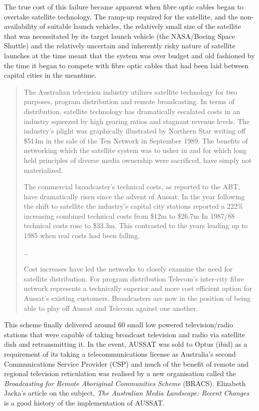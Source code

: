 The true cost of this failure became apparent when fibre optic cables began to overtake satellite technology. The ramp-up required for the satellite, and the non-availability of suitable launch vehicles, the relatively small size of the satellite that was necessitated by its target launch vehicle (the NASA/Boeing Space Shuttle) and the relatively uncertain and inherently risky nature of satellite launches at the time meant that the system was over budget and old fashioned by the time it began to compete with fibre optic cables that had been laid between capital cities in the meantime.
\begin{quotation}
The Australian television industry utilizes satellite technology for two purposes, program distribution and remote broadcasting. In terms of distribution, satellite technology has dramatically escalated costs in an industry squeezed by high gearing ratios and stagnant revenue levels. The industry's plight was graphically illustrated by Northern Star writing off \$514m in the sale of the Ten Network in September 1989. The benefits of networking which the satellite system was to usher in and for which long held principles of diverse media ownership were sacrificed, have simply not materialized.

The commercial broadcaster's technical costs, as reported to the ABT, have dramatically risen since the advent of Aussat. In the year following the shift to satellite the industry's capital city stations reported a 222\% increasing combined technical costs from \$12m to \$26.7m In 1987/88 technical costs rose to \$33.3m. This contrasted to the years leading up to 1985 when real costs had been falling.

\ldots

Cost increases have led the networks to closely examine the need for satellite distribution. For program distribution Telecom's inter-city fibre network represents a technically superior and more cost efficient option for Aussat's existing customers. Broadcasters are now in the position of being able to play off Aussat and Telecom against one another\cite[p333]{RefWorks:334}.
\end{quotation}

This scheme finally delivered around 60 small low powered television/radio stations that were capable of taking broadcast television and radio via satellite dish and retransmitting it. In the event, AUSSAT was sold to Optus (ibid) as a requirement of its taking a telecommunications license as Australia's second Communications Service Provider (CSP) and much of the benefit of remote and regional television reticulation was realised by a new organisation called the \emph{Broadcasting for Remote Aboriginal Communities Scheme} (BRACS). Elizabeth Jacka's article on the subject, \emph{The Australian Media Landscape: Recent Changes} \cite{RefWorks:59} is a good history of the implementation of AUSSAT. 


